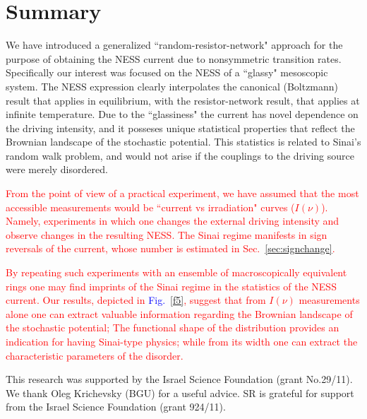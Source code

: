 \documentclass[aps,pre,floats,floatfix,twocolumn]{revtex4}
\newcommand{\Fig}[1]{\textcolor{blue}{Fig.}\!\!~\ref{#1}}
\newcommand{\rmrk}[1]{\textcolor{red}{#1}}
\begin{document}
\section{Summary}
\label{sec:summary}

We have introduced a generalized ``random-resistor-network"
approach for the purpose of obtaining the NESS current
due to nonsymmetric transition rates. Specifically our 
interest was focused on the NESS of a ``glassy" mesoscopic system. 
The NESS expression clearly interpolates the canonical (Boltzmann) result 
that applies in equilibrium, with the resistor-network result, 
that applies at infinite temperature. 
Due to the ``glassiness" the current has novel dependence 
on the driving intensity, and it posseses unique statistical properties 
that reflect the Brownian landscape of the stochastic potential.
This statistics is related to Sinai's random walk problem, 
and would not arise if the couplings to the driving source 
were merely disordered.

\rmrk{From the point of view of a practical experiment, 
we have assumed that the most accessible measurements 
would be ``current vs irradiation" curves ($I(\nu)$). 
Namely, experiments in which one changes the external driving 
intensity and observe changes in the resulting NESS. 
The Sinai regime manifests in sign reversals
of the current, whose number is estimated in Sec.~\ref{sec:signchange}.}

\rmrk{By repeating such experiments with an ensemble
of macroscopically equivalent rings one may find imprints 
of the Sinai regime in the statistics of the NESS current.
Our results, depicted in \Fig{f5}, suggest that from $I(\nu)$ measurements alone 
one can extract valuable information regarding 
the Brownian landscape of the stochastic potential;
The functional shape of the distribution provides 
an indication for having Sinai-type physics; 
while from its width one can extract the characteristic 
parameters of the disorder.}       


\begin{acknowledgements}
%
This research was supported by the Israel Science Foundation (grant No.29/11).
We thank Oleg Krichevsky (BGU) for a useful advice. SR is grateful for support from
the Israel Science Foundation (grant 924/11).
%
\end{acknowledgements}
\end{document}
